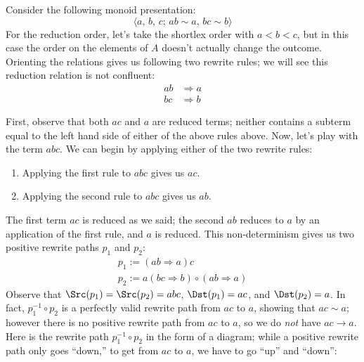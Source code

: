 \documentclass[../generics]{subfiles}
\begin{document}
\begin{example}\label{not confluent presentation}
Consider the following monoid presentation:
\[\langle a,\,b,\,c;\,ab\sim a,\,bc\sim b\rangle\]
For the reduction order, let's take the shortlex order with $a<b<c$, but in this case the order on the elements of $A$ doesn't actually change the outcome. Orienting the relations gives us following two rewrite rules; we will see this reduction relation is not confluent:
\begin{align*}
ab&\Rightarrow a\\
bc&\Rightarrow b
\end{align*}

%
First, observe that both $ac$ and $a$ are reduced terms; neither contains a subterm equal to the left hand side of either of the above rules above. Now, let's play with the term $abc$. We can begin by applying either of the two rewrite rules:
\begin{enumerate}
\item Applying the first rule to $abc$ gives us $ac$.
\item Applying the second rule to $abc$ gives us $ab$.
\end{enumerate}
The first term $ac$ is reduced as we said; the second $ab$ reduces to $a$ by an application of the first rule, and $a$ is reduced. This non-determinism gives us two positive rewrite paths $p_1$ and $p_2$:
\begin{gather*}
p_1 := (ab\Rightarrow a)c\\
p_2 := a(bc\Rightarrow b)\circ(ab\Rightarrow a)
\end{gather*}
%
Observe that $\Src(p_1)=\Src(p_2)=abc$, $\Dst(p_1)=ac$, and $\Dst(p_2)=a$. In fact, $p_1^{-1}\circ p_2$ is a perfectly valid rewrite path from $ac$ to $a$, showing that $ac\sim a$; however there is no positive rewrite path from $ac$ to $a$, so we do \emph{not} have $ac\rightarrow a$. Here is the rewrite path $p_1^{-1}\circ p_2$ in the form of a diagram; while a positive rewrite path only goes ``down,'' to get from $ac$ to $a$, we have to go ``up'' and ``down'':
\begin{quote}

\end{quote}
\end{example}
\end{document}
